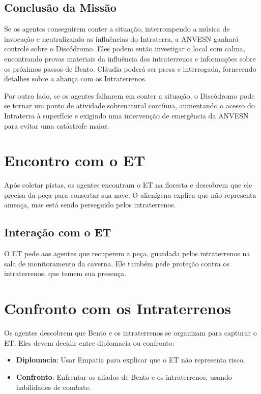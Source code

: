 \subsection{Conclusão da Missão}
Se os agentes conseguirem conter a situação, interrompendo a música de invocação e neutralizando as influências do Intraterra, a ANVESN ganhará controle sobre o Discódromo. Eles podem então investigar o local com calma, encontrando provas materiais da influência dos intraterrenos e informações sobre os próximos passos de Bento. Cláudia poderá ser presa e interrogada, fornecendo detalhes sobre a aliança com os Intraterrenos.

Por outro lado, se os agentes falharem em conter a situação, o Discódromo pode se tornar um ponto de atividade sobrenatural contínua, aumentando o acesso do Intraterra à superfície e exigindo uma intervenção de emergência da ANVESN para evitar uma catástrofe maior.


\section{Encontro com o ET}

Após coletar pistas, os agentes encontram o ET na floresta e descobrem que ele precisa da peça para consertar sua nave. O alienígena explica que não representa ameaça, mas está sendo perseguido pelos intraterrenos.

\subsection{Interação com o ET}

O ET pede aos agentes que recuperem a peça, guardada pelos intraterrenos na sala de monitoramento da caverna. Ele também pede proteção contra os intraterrenos, que temem sua presença.

\section{Confronto com os Intraterrenos}

Os agentes descobrem que Bento e os intraterrenos se organizam para capturar o ET. Eles devem decidir entre diplomacia ou confronto:

\begin{itemize}
    \item \textbf{Diplomacia}: Usar Empatia para explicar que o ET não representa risco.
    \item \textbf{Confronto}: Enfrentar os aliados de Bento e os intraterrenos, usando habilidades de combate.
\end{itemize}

